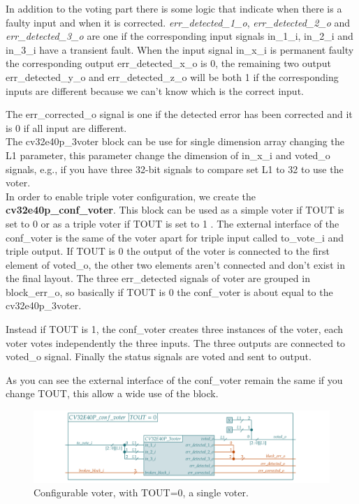 {        In addition to the voting part there is some logic that indicate when there is a faulty input and when it is corrected.
        \textit{err\_detected\_1\_o}, \textit{err\_detected\_2\_o} and \textit{err\_detected\_3\_o} are one if the corresponding input signals in\_1\_i, in\_2\_i and in\_3\_i have a transient fault. When the input signal in\_x\_i is permanent faulty the corresponding output  err\_detected\_x\_o is 0, the remaining two output err\_detected\_y\_o and err\_detected\_z\_o will be both 1 if the corresponding inputs are different because we can't know which is the correct input.
        
        The err\_corrected\_o signal is one if the detected error has been corrected and it is 0 if all input are different.\\
        
        The cv32e40p\_3voter block can be use for single dimension array changing the L1 parameter, this parameter change the dimension of in\_x\_i and voted\_o signals, e.g., if you have three 32-bit signals to compare set L1 to 32 to use the voter.\\
        
        
        In order to enable triple voter configuration, we create the \textbf{cv32e40p\_conf\_voter}.
        This block can be used as a simple voter if TOUT is set to 0   or as a triple voter if TOUT is set to 1  .
        The external interface of the conf\_voter is the same of the voter apart for triple input called to\_vote\_i and triple output. 
        If TOUT is 0 the  output of the voter is connected to the first element of voted\_o, the other two elements aren't connected and don't exist in the final layout. The three err\_detected signals of voter are grouped in block\_err\_o, so basically if TOUT is 0 the conf\_voter is about equal to the cv32e40p\_3voter.
        
        Instead if TOUT is 1, the conf\_voter creates three instances of the voter, each voter votes independently the three inputs. The three outputs are connected to voted\_o signal. 
        Finally the status signals are voted and sent to output.
        
        As you can see the external interface of the conf\_voter remain the same if you change TOUT, this allow a wide use of the block.\\
        
	    \begin{figure}[H]
    		\centering
    		\includegraphics[width=1.3\textwidth,center]{./images/cv32e40p_conf_voter.png}
    		\caption{Configurable voter, with TOUT=0, a single voter.}
    		\label{fig:cv32e40p_conf_voter}
    	\end{figure} 	
    	
}
